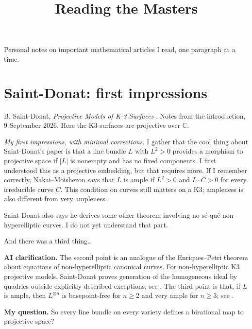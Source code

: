 



\title{Reading the Masters}
\maketitle

\label{section-phantom}

\noindent
Personal notes on important mathematical
articles I read, one paragraph at a time.

\medskip
\tableofcontents

\section{Saint-Donat: first impressions}
\label{section-saint-donat}

\noindent
B. Saint-Donat, \textit{Projective Models
of K-3 Surfaces} \cite{saint-donat}.
Notes from the introduction, 9 September
2026. Here the K3 surfaces are projective
over $\mathbb{C}$.

\medskip\noindent
\textit{My first impressions, with minimal
corrections.}
I gather that the cool thing about
Saint-Donat's paper is that a line bundle
$L$ with $L^2>0$ provides a morphism to
projective space if $|L|$ is nonempty and
has no fixed components. I first understood
this as a projective embedding, but that
requires more. If I remember correctly,
Nakai--Moishezon says that $L$ is ample if
$L^2>0$ and $L\cdot C>0$ for every
irreducible curve $C$. This condition on
curves still matters on a K3; ampleness is
also different from very ampleness.

Saint-Donat also says he derives some other
theorem involving no s\'e qu\'e
non-hyperelliptic curves. I do not yet
understand that part.

And there was a third thing\ldots

\medskip\noindent
\textbf{AI clarification.}
The second point is an analogue of the
Enriques--Petri theorem about equations of
non-hyperelliptic canonical curves. For
non-hyperelliptic K3 projective models,
Saint-Donat proves
generation of the homogeneous ideal by
quadrics outside explicitly described
exceptions; see
\cite[Theorem 7.2]{saint-donat}.
The third point is that, if $L$ is ample,
then $L^{\otimes n}$ is basepoint-free for
$n\geq 2$ and very ample for $n\geq 3$;
see \cite[Theorem 8.3]{saint-donat}.

\medskip\noindent
\textbf{My question.}
So every line bundle on every variety
defines a birational map to projective
space?

